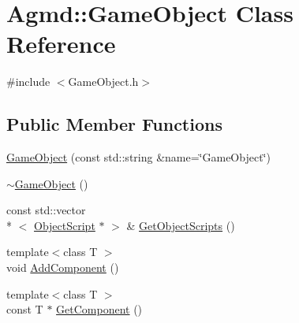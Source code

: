 \hypertarget{class_agmd_1_1_game_object}{\section{Agmd\+:\+:Game\+Object Class Reference}
\label{class_agmd_1_1_game_object}
}


{\ttfamily \#include $<$Game\+Object.\+h$>$}

\subsection*{Public Member Functions}
\begin{DoxyCompactItemize}
\item 
\hyperlink{class_agmd_1_1_game_object_a762704a708857a2c1f551cb33a7b3d13}{Game\+Object} (const std\+::string \&name=\char`\"{}Game\+Object\char`\"{})
\item 
\hyperlink{class_agmd_1_1_game_object_aadf34b3622e192450831e7284f1c4d85}{$\sim$\+Game\+Object} ()
\item 
const std\+::vector\\*
$<$ \hyperlink{class_agmd_1_1_object_script}{Object\+Script} $\ast$ $>$ \& \hyperlink{class_agmd_1_1_game_object_a84f304a31e6de715768912ad2090796b}{Get\+Object\+Scripts} ()
\item 
{\footnotesize template$<$class T $>$ }\\void \hyperlink{class_agmd_1_1_game_object_acee899f466a57100460d491b2ffb601b}{Add\+Component} ()
\item 
{\footnotesize template$<$class T $>$ }\\const T $\ast$ \hyperlink{class_agmd_1_1_game_object_a13fcf85abdd9da8bc7ecc6518eb9e143}{Get\+Component} ()
\end{DoxyCompactItemize}


